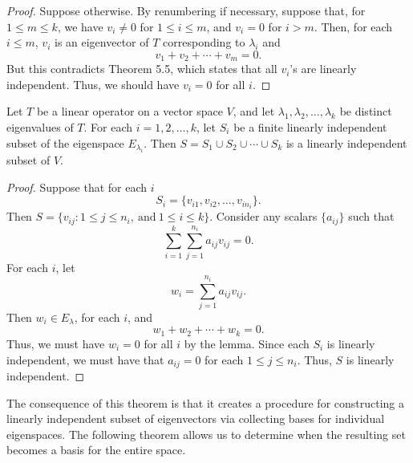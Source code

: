 \begin{proof}
Suppose otherwise. By renumbering if necessary, suppose that, for \( 1 \leq m \leq k  \), we have \( {v}_{i} \neq 0  \) for \( 1 \leq i \leq m \), and \( {v}_{i} = 0  \) for \( i > m  \). Then, for each \( i \leq m  \), \( {v}_{i} \) is an eigenvector of \( T \) corresponding to \( {\lambda}_{i} \) and  
\[ {v}_{1} + {v}_{2} + \cdots + {v}_{m} = 0. \]
But this contradicts Theorem 5.5, which states that all \( {v}_{i} \)'s are linearly independent. Thus, we should have \( {v}_{i} = 0  \) for all \( i \).
\end{proof}

\begin{theorem}
   Let \( T \) be a linear operator on a vector space \( V  \), and let \( {\lambda}_{1}, {\lambda}_{2}, \dots, {\lambda}_{k } \) be distinct eigenvalues of \( T  \). For each \( i = 1,2, \dots, k  \), let \( {S}_{i} \) be a finite linearly independent subset of the eigenspace \( {E}_{{\lambda}_{i}}  \). Then \( S = {S}_{1} \cup {S}_{2} \cup \cdots \cup {S}_{k} \) is a linearly independent subset of \( V  \). 
\end{theorem}
\begin{proof}
Suppose that for each \( i  \) 
\[  {S}_{i} = \{ {v}_{i1}, {v}_{i2}, \dots, {v}_{i {n}_{i}} \}. \]
Then \( S = \{ {v}_{ij} : 1 \leq j \leq {n}_{i}, \ \text{and} \ 1 \leq i \leq k  \}. \) Consider any scalars \( \{ {a}_{ij} \}  \) such that 
\[  \sum_{ i=1 }^{ k  } \sum_{ j=1 }^{ {n}_{i} } {a}_{ij } {v}_{ij} = 0.  \]
For each \( i  \), let 
\[  {w}_{i} = \sum_{ j=1  }^{ {n}_{i} } {a}_{ij} {v}_{ij}. \]
Then \( {w}_{i} \in {E}_{\lambda}  \), for each \( i \), and 
\[  {w}_{1} + {w}_{2} + \cdots + {w}_{k} = 0. \]
Thus, we must have \( {w}_{i} = 0  \) for all \( i  \) by the lemma. Since each \( {S}_{i} \) is linearly independent, we must have that \( {a}_{ij} = 0  \) for each \( 1 \leq j \leq {n}_{i}  \). Thus, \( S  \) is linearly independent.
\end{proof}

The consequence of this theorem is that it creates a procedure for constructing a linearly independent subset of eigenvectors via collecting bases for individual eigenspaces. The following theorem allows us to determine when the resulting set becomes a basis for the entire space.

